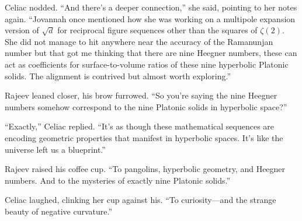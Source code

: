 Celiac nodded. “And there’s a deeper connection,” she said, pointing to her notes again. “Jovannah once mentioned how she was working on a multipole expansion version of \(\sqrt{d}\) for reciprocal figure sequences other than the squares of \(\zeta(2)\). She did not manage to hit anywhere near the accuracy of the Ramanunjan number but that got me thinking that there are nine Heegner numbers, these can act as coefficients for surface-to-volume ratios of these nine hyperbolic Platonic solids. The alignment is contrived but almost worth exploring.”

Rajeev leaned closer, his brow furrowed. “So you’re saying the nine Heegner numbers somehow correspond to the nine Platonic solids in hyperbolic space?”

“Exactly,” Celiac replied. “It’s as though these mathematical sequences are encoding geometric properties that manifest in hyperbolic spaces. It’s like the universe left us a blueprint.”

Rajeev raised his coffee cup. “To pangolins, hyperbolic geometry, and Heegner numbers. And to the mysteries of exactly nine Platonic solids.”

Celiac laughed, clinking her cup against his. “To curiosity—and the strange beauty of negative curvature.”








